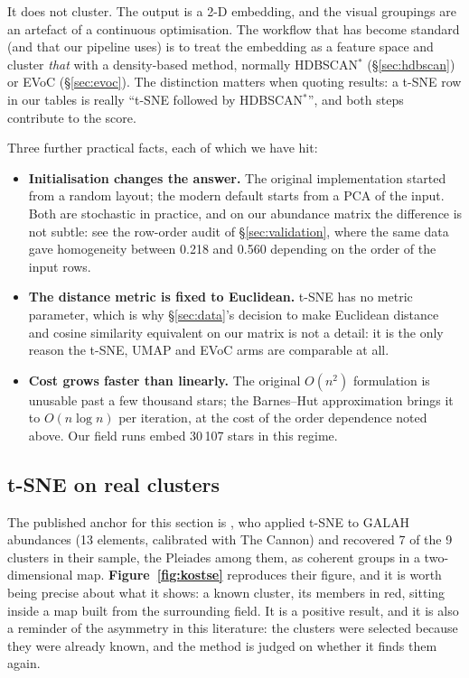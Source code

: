 It does not cluster. The output is a 2-D embedding, and the visual groupings
are an artefact of a continuous optimisation. The workflow that has become
standard (and that our pipeline uses) is to treat the embedding as a feature
space and cluster \emph{that} with a density-based method, normally HDBSCAN$^*$
(\S\ref{sec:hdbscan}) or EVoC (\S\ref{sec:evoc}). The distinction matters when
quoting results: a t-SNE row in our tables is really ``t-SNE followed by
HDBSCAN$^*$'', and both steps contribute to the score.

Three further practical facts, each of which we have hit:

\begin{itemize}
\item \textbf{Initialisation changes the answer.} The original implementation
  started from a random layout; the modern default starts from a PCA of the
  input. Both are stochastic in practice, and on our abundance matrix the
  difference is not subtle: see the row-order audit of \S\ref{sec:validation},
  where the same data gave homogeneity between 0.218 and 0.560 depending on
  the order of the input rows.
\item \textbf{The distance metric is fixed to Euclidean.} t-SNE has no
  metric parameter, which is why \S\ref{sec:data}'s decision to make
  Euclidean distance and cosine similarity equivalent on our matrix is not a
  detail: it is the only reason the t-SNE, UMAP and EVoC arms are comparable
  at all.
\item \textbf{Cost grows faster than linearly.} The original $O(n^2)$
  formulation is unusable past a few thousand stars; the Barnes--Hut
  approximation \citep{vanderMaaten:14} brings it to
  $O(n \log n)$ per iteration, at the cost of the order dependence noted
  above. Our field runs embed 30\,107 stars in this regime.
\end{itemize}

\subsection{t-SNE on real clusters}

The published anchor for this section is \citet{Kos:17}, who applied t-SNE to
GALAH abundances (13 elements, calibrated with The Cannon) and recovered 7 of
the 9 clusters in their sample, the Pleiades among them, as coherent groups in
a two-dimensional map. \textbf{Figure~\ref{fig:kostse}} reproduces their
figure, and it is worth being precise about what it shows: a known cluster, its
members in red, sitting inside a map built from the surrounding field. It is a
positive result, and it is also a reminder of the asymmetry in this literature:
the clusters were selected because they were already known, and the method is
judged on whether it finds them again.


